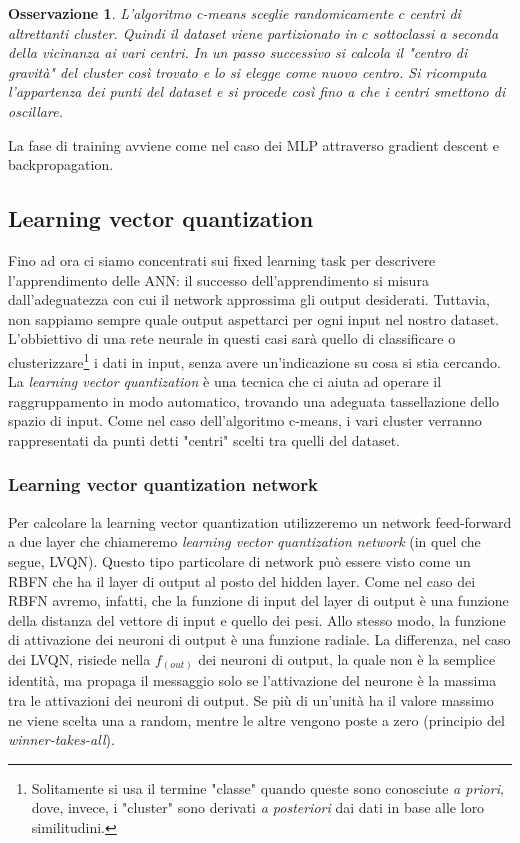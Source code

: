 \documentclass[10pt,a4paper]{article}
\newtheorem{remark}{Osservazione}
\begin{document}
\begin{remark}
\emph{L'algoritmo c-means sceglie randomicamente $c$ centri di altrettanti cluster. Quindi il dataset viene partizionato in $c$ sottoclassi a seconda della vicinanza ai vari centri. In un passo successivo si calcola il "centro di gravità" del cluster così trovato e lo si elegge come nuovo centro. Si ricomputa l'appartenza dei punti del dataset e si procede così fino a che i centri smettono di oscillare.}
\end{remark}

La fase di training avviene come nel caso dei MLP attraverso gradient descent e backpropagation. 

\subsection{Learning vector quantization}

Fino ad ora ci siamo concentrati sui fixed learning task per descrivere l'apprendimento delle ANN: il successo dell'apprendimento si misura dall'adeguatezza con cui il network approssima gli output desiderati. Tuttavia, non sappiamo sempre quale output aspettarci per ogni input nel nostro dataset. L'obbiettivo di una rete neurale in questi casi sarà quello di classificare o clusterizzare\footnote{Solitamente si usa il termine "classe" quando queste sono conosciute \emph{a priori}, dove, invece, i "cluster" sono derivati \emph{a posteriori} dai dati in base alle loro similitudini.} i dati in input, senza avere un'indicazione su cosa si stia cercando. La \emph{learning vector quantization} è una tecnica che ci aiuta ad operare il raggruppamento in modo automatico, trovando una adeguata tassellazione dello spazio di input. Come nel caso dell'algoritmo c-means, i vari cluster verranno rappresentati da punti detti "centri" scelti tra quelli del dataset.

\subsubsection{Learning vector quantization network}

Per calcolare la learning vector quantization utilizzeremo un network feed-forward a due layer che chiameremo \emph{learning vector quantization network} (in quel che segue, LVQN). Questo tipo particolare di network può essere visto come un RBFN che ha il layer di output al posto del hidden layer. Come nel caso dei RBFN avremo, infatti, che la funzione di input del layer di output è una funzione della distanza del vettore di input e quello dei pesi. Allo stesso modo, la funzione di attivazione dei neuroni di output è una funzione radiale. La differenza, nel caso dei LVQN, risiede nella $f_{(out)}$ dei neuroni di output, la quale non è la semplice identità, ma propaga il messaggio solo se l'attivazione del neurone è la massima tra le attivazioni dei neuroni di output. Se più di un'unità ha il valore massimo ne viene scelta una a random, mentre le altre vengono poste a zero (principio del \emph{winner-takes-all}). 
\end{document}
